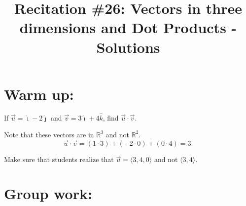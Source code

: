 \documentclass[noinstructornotes]{ximera}
\title{Recitation \#26: Vectors in three dimensions and Dot Products - Solutions}
\begin{document}
\begin{abstract}		\end{abstract}
\maketitle


\section{Warm up:}
If $\vec{u} = \hat{\imath} - 2 \hat{\jmath}$ and $\vec{v} = 3 \hat{\imath} + 4 \hat{k}$, find $\vec{u} \cdot \vec{v}$.
	\begin{freeResponse}
	Note that these vectors are in $\mathbb{R}^3$ and not $\mathbb{R}^2$.
	\[
	\vec{u} \cdot \vec{v} = (1 \cdot 3) + (-2 \cdot 0) + (0 \cdot 4) = \boxed{3}.
	\]
	\end{freeResponse}
	
\begin{instructorNotes}
Make sure that students realize that $\vec{u} = \langle 3,4,0 \rangle$ and not $\langle 3,4 \rangle$.
\end{instructorNotes}







\section{Group work:}
\end{document}
